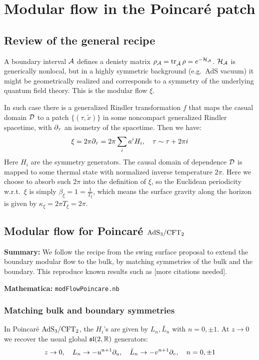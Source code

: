 \documentclass[11pt,a4paper]{article}
\begin{document}
	
\pagebreak

\section{Modular flow in the Poincar\'e patch}
	
\subsection{Review of the general recipe}
	A boundary interval $\mathcal{A}$ defines a denisty matrix $\rho_{\mathcal{A}} = \operatorname{tr}_{\bar{\mathcal{A}}} \rho = e^{-\mathcal{H}_{\mathcal{A}}}$. $\mathcal{H}_{\mathcal{A}}$ is generically nonlocal, but in a highly symmetric background (e.g.~AdS vacuum) it might be geometrically realized and corresponds to a symmetry of the underlying quantum field theory. This is the modular flow $\xi$. 
	
	In such case there is a generalized Rindler transformation $f$ that maps the casual domain $\mathcal{D}$ to a patch $\{(\tau,\tilde{x})\}$ in some noncompact generalized Rindler spacetime, with $\partial_{\tau}$ an isometry of the spacetime. Then we have:
	\begin{equation}
		\xi = 2\pi \partial_{\tau}
		= 2\pi \sum_i a^i H_i,
	\quad
		\tau \sim \tau + 2\pi i
	\end{equation}
	Here $H_i$ are the symmetry generators. The causal domain of dependence $\mathcal{D}$ is mapped to some thermal state with normalized inverse temperature $2\pi$. Here we choose to absorb such $2\pi$ into the definition of $\xi$, so the Euclidean periodicity w.r.t.~$\xi$ is simply $\beta_\xi = 1 = \frac{1}{T_\xi}$, which means the surface gravity along the horizon is given by $\kappa_\xi = 2\pi T_\xi = 2\pi$. 

\pagebreak

\subsection{Modular flow for Poincar\'e $\mathrm{AdS}_3/\mathrm{CFT}_2$}

\textbf{Summary:} We follow the recipe from the swing surface proposal \cite{Apolo:2020bld,Apolo:2020qjm} to extend the boundary modular flow to the bulk, by matching symmetries of the bulk and the boundary. This reproduce known results such as \cite{Lashkari:2016idm,Czech:2019vih,Apolo:2020qjm} [more citations needed].

\noindent\textbf{Mathematica:} \texttt{modFlowPoincare.nb}

\subsubsection{Matching bulk and boundary symmetries}
	In Poincar\'e $\mathrm{AdS}_3/\mathrm{CFT}_2$, the $H_i$'s are given by $L_n,\bar{L}_n$ with $n=0,\pm 1$. At $z\to 0$ we recover the usual global $\mathfrak{sl}(2,\mathbb{R})$ generators:
	\begin{equation}
		z\to 0,
	\quad
		      L_n \to -u^{n+1} \partial_{u},\quad
		\bar{L}_n \to -v^{n+1} \partial_{v},\quad
	n = 0,\pm 1
	\end{equation}
	
\end{document}
